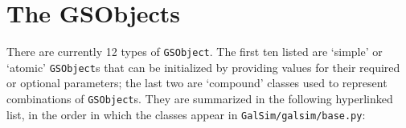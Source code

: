 \documentclass[preprint,11pt]{aastex}
\newcommand{\gsobject}{{\tt GSObject}}
\begin{document}
\newpage

\section{The GSObjects}\label{sect:gsobjects}

There are currently 12 types of \gsobject. The first ten listed are
`simple' or `atomic' \gsobject s that can be initialized by providing
values for their required or optional parameters; the last two are
`compound' classes used to represent combinations of \gsobject s.  
They are summarized in the following hyperlinked list, 
in the order in which the classes appear in {\tt GalSim/galsim/base.py}:
\end{document}
